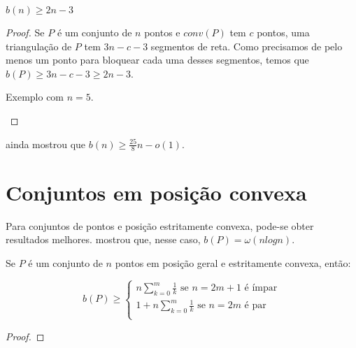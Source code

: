 \begin{teorema}
    $b(n)\geq 2n-3$
\end{teorema}
\begin{proof}
    Se $P$ é um conjunto de $n$ pontos e $conv(P)$ tem $c$ pontos, uma triangulação de $P$ tem $3n-c-3$ segmentos de reta. Como precisamos de pelo menos um ponto para bloquear cada uma desses segmentos, temos que $b(P)\geq 3n-c-3\geq 2n-3$.
    \begin{center}
        
    Exemplo com $n=5$.
    \end{center}
\end{proof}

\cite{block} ainda mostrou que $b(n)\geq \frac{25}{8}n-o(1)$.

\section {Conjuntos em posição convexa}
Para conjuntos de pontos e posição estritamente convexa, pode-se obter resultados melhores. \cite{blockers} mostrou que, nesse caso, $b(P)=\omega(nlogn)$.

\begin{teorema}
Se $P$ é um conjunto de $n$ pontos em posição geral e estritamente convexa, então:

    $$b(P)\geq
    \begin{cases}
        n\sum_{k=0}^m\frac{1}{k} \text{ se }n=2m+1\text{ é ímpar}\\
        1+n\sum_{k=0}^m\frac{1}{k} \text{ se }n=2m\text{ é par}\\
    \end{cases}$$
\end{teorema}
\begin{proof}

\end{proof}

